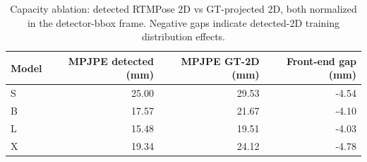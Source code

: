 \begin{table}[t]
\centering
\caption{Capacity ablation: detected RTMPose 2D vs GT-projected 2D, both normalized in the detector-bbox frame. Negative gaps indicate detected-2D training distribution effects.}
\begin{tabular}{lrrr}
\toprule
Model & MPJPE detected (mm) & MPJPE GT-2D (mm) & Front-end gap (mm) \\
\midrule
S & 25.00 & 29.53 & -4.54 \\
B & 17.57 & 21.67 & -4.10 \\
L & 15.48 & 19.51 & -4.03 \\
X & 19.34 & 24.12 & -4.78 \\
\bottomrule
\end{tabular}
\end{table}